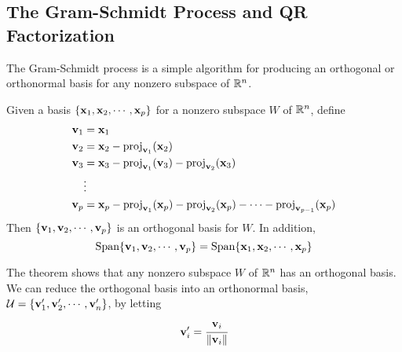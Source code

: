 \subsection{The Gram-Schmidt Process and QR Factorization}
    The Gram-Schmidt process is a simple algorithm for producing an orthogonal or orthonormal basis for any nonzero subspace of $\mathbb{R}^n$.
    \begin{Thm}
        Given a basis $\{\mathbf{x}_1, \mathbf{x}_2, \cdots, \mathbf{x}_p \}$ for a nonzero subspace $W$ of $\mathbb{R}^n$, define
        \begin{align*}
            \mathbf{v}_1 &= \mathbf{x}_1\\
            \mathbf{v}_2 &= \mathbf{x}_2 - \text{proj}_{\mathbf{v}_1}(\mathbf{x}_2)\\
            \mathbf{v}_3 &= \mathbf{x}_3 - \text{proj}_{\mathbf{v}_1}(\mathbf{v}_3) - \text{proj}_{\mathbf{v}_2}(\mathbf{x}_3)\\
            &\vdots \\
            \mathbf{v}_p &= \mathbf{x}_p - \text{proj}_{\mathbf{v}_1}(\mathbf{x}_p) - \text{proj}_{\mathbf{v}_2}(\mathbf{x}_p) - \cdots - \text{proj}_{\mathbf{v}_{p - 1}}(\mathbf{x}_p)
        \end{align*}
        Then $\{ \mathbf{v}_1,\mathbf{v}_2, \cdots, \mathbf{v}_p  \}$ is an orthogonal basis for $W$. In addition,
        \begin{equation*}
            \text{Span}\{  \mathbf{v}_1,\mathbf{v}_2, \cdots, \mathbf{v}_p \} = \text{Span}\{ \mathbf{x}_1, \mathbf{x}_2, \cdots, \mathbf{x}_p \}
        \end{equation*}

        \begin{Rem}
            The theorem shows that any nonzero subspace $W$ of $\mathbb{R}^n$ has an orthogonal basis. We can reduce the orthogonal basis into an orthonormal basis, $\mathcal{U} = \{ \mathbf{v}_1', \mathbf{v}_2', \cdots, \mathbf{v}_n' \}$, by letting
            \begin{equation*}
                \mathbf{v}_i' = \cfrac{\mathbf{v}_i}{\lVert \mathbf{v}_i \rVert}
            \end{equation*}
        \end{Rem}
    \end{Thm}

